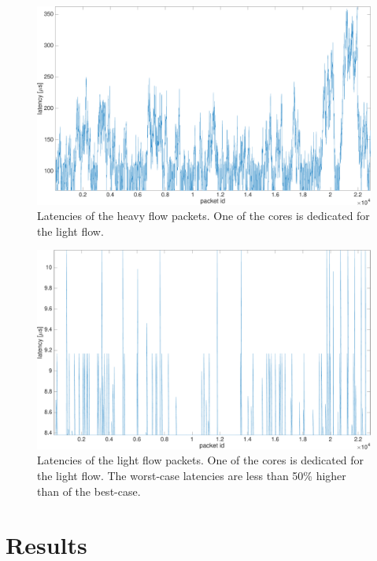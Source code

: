 \begin{figure}[]
  \begin{center}
    \includegraphics[width=\textwidth]{images/experiment/exp2-app1-is-coremask-latency.pdf}
    \caption{Latencies of the heavy flow packets. One of the cores is dedicated for the light flow.}
    \label{fig:exp2-app1-is-coremask-latency}
  \end{center}
\end{figure}

\begin{figure}[]
  \begin{center}
    \includegraphics[width=\textwidth]{images/experiment/exp2-app2-is-coremask-latency.pdf}
    \caption{Latencies of the light flow packets. One of the cores is dedicated for the light flow. The worst-case latencies are less than 50\% higher than of the best-case.}
    \label{fig:exp2-app2-is-coremask-latency}
  \end{center}
\end{figure}

\section{Results}

